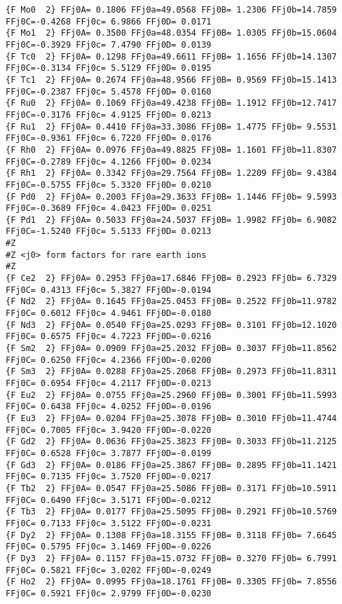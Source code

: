{\begin{verbatim}
{F Mo0  2} FFj0A= 0.1806 FFj0a=49.0568 FFj0B= 1.2306 FFj0b=14.7859 FFj0C=-0.4268 FFj0c= 6.9866 FFj0D= 0.0171 
{F Mo1  2} FFj0A= 0.3500 FFj0a=48.0354 FFj0B= 1.0305 FFj0b=15.0604 FFj0C=-0.3929 FFj0c= 7.4790 FFj0D= 0.0139 
{F Tc0  2} FFj0A= 0.1298 FFj0a=49.6611 FFj0B= 1.1656 FFj0b=14.1307 FFj0C=-0.3134 FFj0c= 5.5129 FFj0D= 0.0195 
{F Tc1  2} FFj0A= 0.2674 FFj0a=48.9566 FFj0B= 0.9569 FFj0b=15.1413 FFj0C=-0.2387 FFj0c= 5.4578 FFj0D= 0.0160 
{F Ru0  2} FFj0A= 0.1069 FFj0a=49.4238 FFj0B= 1.1912 FFj0b=12.7417 FFj0C=-0.3176 FFj0c= 4.9125 FFj0D= 0.0213 
{F Ru1  2} FFj0A= 0.4410 FFj0a=33.3086 FFj0B= 1.4775 FFj0b= 9.5531 FFj0C=-0.9361 FFj0c= 6.7220 FFj0D= 0.0176 
{F Rh0  2} FFj0A= 0.0976 FFj0a=49.8825 FFj0B= 1.1601 FFj0b=11.8307 FFj0C=-0.2789 FFj0c= 4.1266 FFj0D= 0.0234 
{F Rh1  2} FFj0A= 0.3342 FFj0a=29.7564 FFj0B= 1.2209 FFj0b= 9.4384 FFj0C=-0.5755 FFj0c= 5.3320 FFj0D= 0.0210 
{F Pd0  2} FFj0A= 0.2003 FFj0a=29.3633 FFj0B= 1.1446 FFj0b= 9.5993 FFj0C=-0.3689 FFj0c= 4.0423 FFj0D= 0.0251 
{F Pd1  2} FFj0A= 0.5033 FFj0a=24.5037 FFj0B= 1.9982 FFj0b= 6.9082 FFj0C=-1.5240 FFj0c= 5.5133 FFj0D= 0.0213 
#Z
#Z <j0> form factors for rare earth ions
#Z
{F Ce2  2} FFj0A= 0.2953 FFj0a=17.6846 FFj0B= 0.2923 FFj0b= 6.7329 FFj0C= 0.4313 FFj0c= 5.3827 FFj0D=-0.0194 
{F Nd2  2} FFj0A= 0.1645 FFj0a=25.0453 FFj0B= 0.2522 FFj0b=11.9782 FFj0C= 0.6012 FFj0c= 4.9461 FFj0D=-0.0180 
{F Nd3  2} FFj0A= 0.0540 FFj0a=25.0293 FFj0B= 0.3101 FFj0b=12.1020 FFj0C= 0.6575 FFj0c= 4.7223 FFj0D=-0.0216 
{F Sm2  2} FFj0A= 0.0909 FFj0a=25.2032 FFj0B= 0.3037 FFj0b=11.8562 FFj0C= 0.6250 FFj0c= 4.2366 FFj0D=-0.0200 
{F Sm3  2} FFj0A= 0.0288 FFj0a=25.2068 FFj0B= 0.2973 FFj0b=11.8311 FFj0C= 0.6954 FFj0c= 4.2117 FFj0D=-0.0213 
{F Eu2  2} FFj0A= 0.0755 FFj0a=25.2960 FFj0B= 0.3001 FFj0b=11.5993 FFj0C= 0.6438 FFj0c= 4.0252 FFj0D=-0.0196 
{F Eu3  2} FFj0A= 0.0204 FFj0a=25.3078 FFj0B= 0.3010 FFj0b=11.4744 FFj0C= 0.7005 FFj0c= 3.9420 FFj0D=-0.0220 
{F Gd2  2} FFj0A= 0.0636 FFj0a=25.3823 FFj0B= 0.3033 FFj0b=11.2125 FFj0C= 0.6528 FFj0c= 3.7877 FFj0D=-0.0199 
{F Gd3  2} FFj0A= 0.0186 FFj0a=25.3867 FFj0B= 0.2895 FFj0b=11.1421 FFj0C= 0.7135 FFj0c= 3.7520 FFj0D=-0.0217 
{F Tb2  2} FFj0A= 0.0547 FFj0a=25.5086 FFj0B= 0.3171 FFj0b=10.5911 FFj0C= 0.6490 FFj0c= 3.5171 FFj0D=-0.0212 
{F Tb3  2} FFj0A= 0.0177 FFj0a=25.5095 FFj0B= 0.2921 FFj0b=10.5769 FFj0C= 0.7133 FFj0c= 3.5122 FFj0D=-0.0231 
{F Dy2  2} FFj0A= 0.1308 FFj0a=18.3155 FFj0B= 0.3118 FFj0b= 7.6645 FFj0C= 0.5795 FFj0c= 3.1469 FFj0D=-0.0226 
{F Dy3  2} FFj0A= 0.1157 FFj0a=15.0732 FFj0B= 0.3270 FFj0b= 6.7991 FFj0C= 0.5821 FFj0c= 3.0202 FFj0D=-0.0249 
{F Ho2  2} FFj0A= 0.0995 FFj0a=18.1761 FFj0B= 0.3305 FFj0b= 7.8556 FFj0C= 0.5921 FFj0c= 2.9799 FFj0D=-0.0230 

\end{verbatim}}
